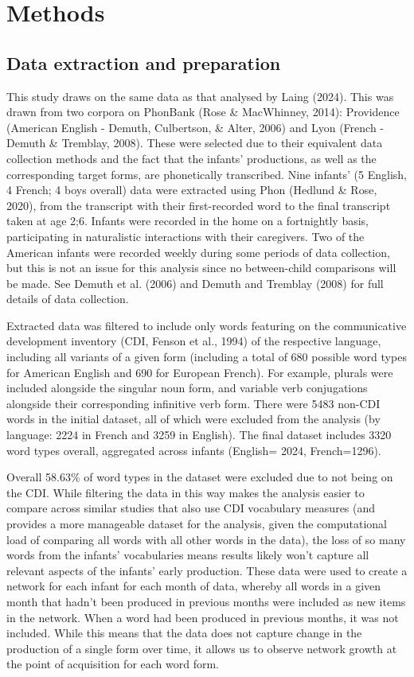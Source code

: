 \documentclass[
  man]{apa6}
\begin{document}
\section{Methods}\label{methods}

\subsection{Data extraction and preparation}\label{data-extraction-and-preparation}

This study draws on the same data as that analysed by Laing (2024). This was drawn from two corpora on PhonBank (Rose \& MacWhinney, 2014): Providence (American English - Demuth, Culbertson, \& Alter, 2006) and Lyon (French - Demuth \& Tremblay, 2008). These were selected due to their equivalent data collection methods and the fact that the infants' productions, as well as the corresponding target forms, are phonetically transcribed. Nine infants' (5 English, 4 French; 4 boys overall) data were extracted using Phon (Hedlund \& Rose, 2020), from the transcript with their first-recorded word to the final transcript taken at age 2;6. Infants were recorded in the home on a fortnightly basis, participating in naturalistic interactions with their caregivers. Two of the American infants were recorded weekly during some periods of data collection, but this is not an issue for this analysis since no between-child comparisons will be made. See Demuth et al. (2006) and Demuth and Tremblay (2008) for full details of data collection.

Extracted data was filtered to include only words featuring on the communicative development inventory (CDI, Fenson et al., 1994) of the respective language, including all variants of a given form (including a total of 680 possible word types for American English and 690 for European French). For example, plurals were included alongside the singular noun form, and variable verb conjugations alongside their corresponding infinitive verb form. There were 5483 non-CDI words in the initial dataset, all of which were excluded from the analysis (by language: 2224 in French and 3259 in English). The final dataset includes 3320 word types overall, aggregated across infants (English=
2024, French=1296).

Overall 58.63\% of word types in the dataset were excluded due to not being on the CDI. While filtering the data in this way makes the analysis easier to compare across similar studies that also use CDI vocabulary measures (and provides a more manageable dataset for the analysis, given the computational load of comparing all words with all other words in the data), the loss of so many words from the infants' vocabularies means results likely won't capture all relevant aspects of the infants' early production. These data were used to create a network for each infant for each month of data, whereby all words in a given month that hadn't been produced in previous months were included as new items in the network. When a word had been produced in previous months, it was not included. While this means that the data does not capture change in the production of a single form over time, it allows us to observe network growth at the point of acquisition for each word form.
\end{document}
